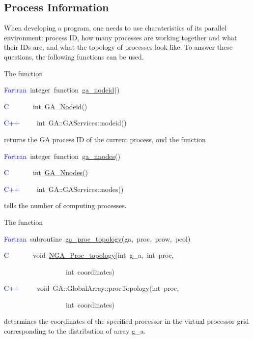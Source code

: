 \subsection{Process Information }

When developing a program, one needs to use charateristics of its
parallel environment: process ID, how many processes are working together
and what their IDs are, and what the topology of processes look like.
To answer these questions, the following functions can be used.

The function
\begin{lyxcode}
\textcolor{blue}{Fortran}~integer~function~\href{http://www.emsl.pnl.gov/docs/global/ga_ops.html\#ga_nodeid}{ga\_{}nodeid}()~

\textcolor{blue}{C}~~~~~~~int~\href{http://www.emsl.pnl.gov/docs/global/c_nga_ops.html\#ga_nodeid}{GA\_{}Nodeid}()~

\textcolor{blue}{C++~}~~~~int~GA::GAServices::nodeid()
\end{lyxcode}
returns the GA process ID of the current process, and the function
\begin{lyxcode}
\textcolor{blue}{Fortran}~integer~function~\href{http://www.emsl.pnl.gov/docs/global/ga_ops.html\#ga_nnodes}{ga\_{}nnodes}()~

\textcolor{blue}{C}~~~~~~~int~\href{http://www.emsl.pnl.gov/docs/global/c_nga_ops.html\#ga_nnodes}{GA\_{}Nnodes}()~

\textcolor{blue}{C++~}~~~~int~GA::GAServices::nodes()
\end{lyxcode}
tells the number of computing processes.

The function
\begin{lyxcode}
\textcolor{blue}{Fortran~}subroutine~\href{http://www.emsl.pnl.gov/docs/global/ga_ops.html\#ga_proc_topology}{ga\_{}proc\_{}topology}(ga,~proc,~prow,~pcol)

\textcolor{blue}{C}~~~~~~~void~\href{http://www.emsl.pnl.gov/docs/global/c_nga_ops.html\#ga_proc_topology}{NGA\_{}Proc\_{}topology}(int~g\_a,~int~proc,~

~~~~~~~~~~~~~~~~~~int~coordinates)

\textcolor{blue}{C++~}~~~~void~GA::GlobalArray::procTopology(int~proc,~

~~~~~~~~~~~~~~~~~~int~coordinates)
\end{lyxcode}
determines the coordinates of the specified processor in the virtual
processor grid corresponding to the distribution of array g\_a.

